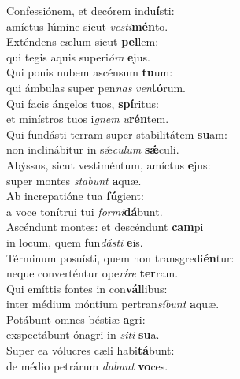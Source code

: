 \evenverse Confessiónem, et decórem indu\textbf{í}sti:~\*\\
\evenverse amíctus lúmine sicut \textit{ve}\textit{sti}\textbf{mén}to.\\
\oddverse Exténdens cælum sicut \textbf{pel}lem:~\*\\
\oddverse qui tegis aquis superi\textit{ó}\textit{ra} \textbf{e}jus.\\
\evenverse Qui ponis nubem ascénsum \textbf{tu}um:~\*\\
\evenverse qui ámbulas super pen\textit{nas} \textit{ven}\textbf{tó}rum.\\
\oddverse Qui facis ángelos tuos, \textbf{spí}ritus:~\*\\
\oddverse et minístros tuos i\textit{gnem} \textit{u}\textbf{rén}tem.\\
\evenverse Qui fundásti terram super stabilitátem \textbf{su}am:~\*\\
\evenverse non inclinábitur in sǽ\textit{cu}\textit{lum} \textbf{sǽ}culi.\\
\oddverse Abýssus, sicut vestiméntum, amíctus \textbf{e}jus:~\*\\
\oddverse super montes \textit{sta}\textit{bunt} \textbf{a}quæ.\\
\evenverse Ab increpatióne tua \textbf{fú}gient:~\*\\
\evenverse a voce tonítrui tui \textit{for}\textit{mi}\textbf{dá}bunt.\\
\oddverse Ascéndunt montes: et descéndunt \textbf{cam}pi~\*\\
\oddverse in locum, quem fun\textit{dá}\textit{sti} \textbf{e}is.\\
\evenverse Términum posuísti, quem non transgredi\textbf{én}tur:~\*\\
\evenverse neque converténtur ope\textit{rí}\textit{re} \textbf{ter}ram.\\
\oddverse Qui emíttis fontes in con\textbf{vál}libus:~\*\\
\oddverse inter médium móntium pertran\textit{sí}\textit{bunt} \textbf{a}quæ.\\
\evenverse Potábunt omnes béstiæ \textbf{a}gri:~\*\\
\evenverse exspectábunt ónagri in \textit{si}\textit{ti} \textbf{su}a.\\
\oddverse Super ea vólucres cæli habi\textbf{tá}bunt:~\*\\
\oddverse de médio petrárum \textit{da}\textit{bunt} \textbf{vo}ces.\\
